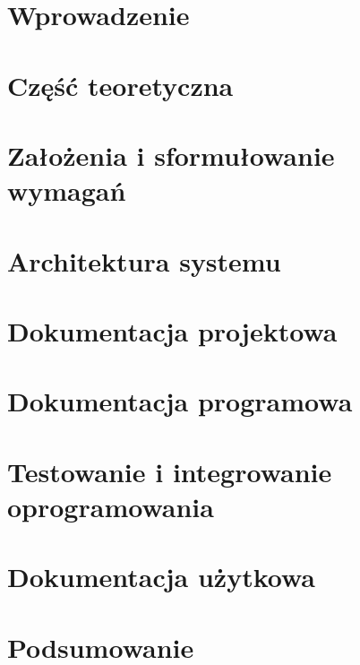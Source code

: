 \documentclass[12pt,oneside,a4paper]{book} %
\theoremstyle{break}
\begin{document}
\thispagestyle{empty} \setcounter{page}{0} \tableofcontents



\thispagestyle{empty}

\chapter{Wprowadzenie}
\thispagestyle{empty}

\pagestyle{fancy}
\chapter{Część teoretyczna}
\thispagestyle{empty}

\pagestyle{fancy}
\chapter{Założenia i sformułowanie wymagań}
\thispagestyle{empty}
\pagestyle{fancy}
\chapter{Architektura systemu}
\thispagestyle{empty}
\pagestyle{fancy}
\chapter{Dokumentacja projektowa}
\thispagestyle{empty}
\pagestyle{fancy}
\chapter{Dokumentacja programowa}
\thispagestyle{empty}
\pagestyle{fancy}
\chapter{Testowanie i integrowanie oprogramowania}
\thispagestyle{empty}
\pagestyle{fancy}
\chapter{Dokumentacja użytkowa}
\thispagestyle{empty}
\pagestyle{fancy}
\chapter{Podsumowanie}
\thispagestyle{empty}


\begin{thebibliography}{00}

\end{thebibliography}
\end{document}

